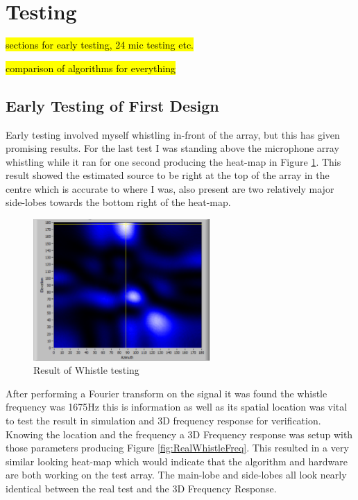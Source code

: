 \documentclass{UoNMCHA}
\numberwithin{equation}{section}
\begin{document}
\newpage
\section{Testing} \label{sec:Lab Testing}
    \hl{sections for early testing, 24 mic testing etc.}
    
    \hl{comparison of algorithms for everything}
\subsection{Early Testing of First Design} \label{sec:First Array Testing}
    Early testing  involved myself whistling in-front of the array, but this has given promising results. For the last test I was standing above the microphone array whistling while it ran for one second producing the heat-map in Figure \ref{fig:RealWhistle}. This result showed the estimated source to be right at the top of the array in the centre which is  accurate to where I was, also present are two relatively major side-lobes towards the bottom right of the heat-map.
    
    \begin{figure} [H]
        \centering
        \includegraphics[keepaspectratio, width = 0.6\textwidth]{Figures/RealWhistle.png}
        \caption{Result of Whistle testing}
        \label{fig:RealWhistle}
    \end{figure}
    
    After performing a Fourier transform on the signal it was found the whistle frequency was 1675Hz this is information as well as its spatial location was vital to test the result in simulation and 3D frequency response for verification. Knowing the location and the frequency a 3D Frequency response was setup with those parameters producing Figure \ref{fig:RealWhistleFreq}. This resulted in a very similar looking heat-map which would indicate that the algorithm and hardware are both working on the test array. The main-lobe and side-lobes all look nearly identical between the real test and the 3D Frequency Response.
    
\end{document}
